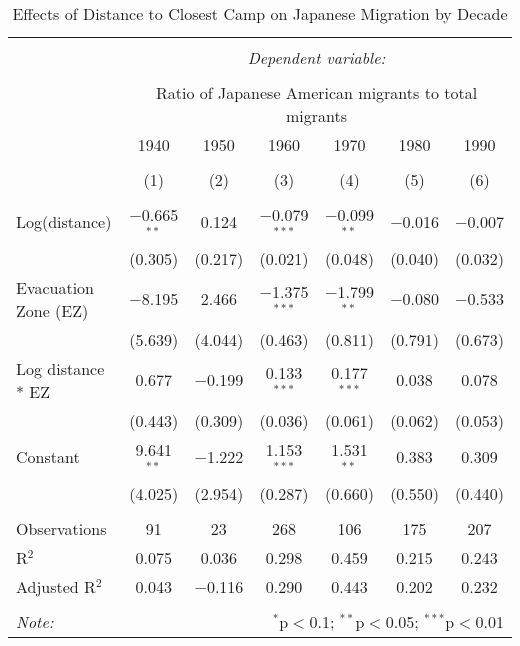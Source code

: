 
\begin{table}[!htbp] \centering 
  \caption{Effects of Distance to Closest Camp on Japanese Migration by Decade} 
  \label{tbl:ezdistreg} 
\begin{tabular}{@{\extracolsep{2pt}}lcccccc} 
\\[-1.8ex]\hline 
\hline \\[-1.8ex] 
 & \multicolumn{6}{c}{\textit{Dependent variable:}} \\ 
\cline{2-7} 
\\[-1.8ex] & \multicolumn{6}{c}{Ratio of Japanese American migrants to total migrants} \\ 
 & 1940 & 1950 & 1960 & 1970 & 1980 & 1990 \\ 
\\[-1.8ex] & (1) & (2) & (3) & (4) & (5) & (6)\\ 
\hline \\[-1.8ex] 
 Log(distance) & $-$0.665$^{**}$ & 0.124 & $-$0.079$^{***}$ & $-$0.099$^{**}$ & $-$0.016 & $-$0.007 \\ 
  & (0.305) & (0.217) & (0.021) & (0.048) & (0.040) & (0.032) \\ 
  Evacuation Zone (EZ) & $-$8.195 & 2.466 & $-$1.375$^{***}$ & $-$1.799$^{**}$ & $-$0.080 & $-$0.533 \\ 
  & (5.639) & (4.044) & (0.463) & (0.811) & (0.791) & (0.673) \\ 
  Log distance * EZ  & 0.677 & $-$0.199 & 0.133$^{***}$ & 0.177$^{***}$ & 0.038 & 0.078 \\ 
  & (0.443) & (0.309) & (0.036) & (0.061) & (0.062) & (0.053) \\ 
  Constant & 9.641$^{**}$ & $-$1.222 & 1.153$^{***}$ & 1.531$^{**}$ & 0.383 & 0.309 \\ 
  & (4.025) & (2.954) & (0.287) & (0.660) & (0.550) & (0.440) \\ 
 \hline \\[-1.8ex] 
Observations & 91 & 23 & 268 & 106 & 175 & 207 \\ 
R$^{2}$ & 0.075 & 0.036 & 0.298 & 0.459 & 0.215 & 0.243 \\ 
Adjusted R$^{2}$ & 0.043 & $-$0.116 & 0.290 & 0.443 & 0.202 & 0.232 \\ 
\hline 
\hline \\[-1.8ex] 
\textit{Note:}  


& \multicolumn{6}{r}{$^{*}$p$<$0.1; $^{**}$p$<$0.05; $^{***}$p$<$0.01} \\ 
\end{tabular} 
\end{table} 

